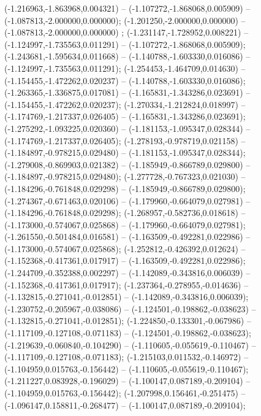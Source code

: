  (-1.216963,-1.863968,0.004321) -- (-1.107272,-1.868068,0.005909) -- (-1.087813,-2.000000,0.000000);
 (-1.201250,-2.000000,0.000000) -- (-1.087813,-2.000000,0.000000) ;
 (-1.231147,-1.728952,0.008221) -- (-1.124997,-1.735563,0.011291) -- (-1.107272,-1.868068,0.005909);
 (-1.243681,-1.595634,0.011668) -- (-1.140788,-1.603330,0.016086) -- (-1.124997,-1.735563,0.011291);
 (-1.254453,-1.464709,0.014630) -- (-1.154455,-1.472262,0.020237) -- (-1.140788,-1.603330,0.016086);
 (-1.263365,-1.336875,0.017081) -- (-1.165831,-1.343286,0.023691) -- (-1.154455,-1.472262,0.020237);
 (-1.270334,-1.212824,0.018997) -- (-1.174769,-1.217337,0.026405) -- (-1.165831,-1.343286,0.023691);
 (-1.275292,-1.093225,0.020360) -- (-1.181153,-1.095347,0.028344) -- (-1.174769,-1.217337,0.026405);
 (-1.278193,-0.978719,0.021158) -- (-1.184897,-0.978215,0.029480) -- (-1.181153,-1.095347,0.028344);
 (-1.279008,-0.869903,0.021382) -- (-1.185949,-0.866789,0.029800) -- (-1.184897,-0.978215,0.029480);
 (-1.277728,-0.767323,0.021030) -- (-1.184296,-0.761848,0.029298) -- (-1.185949,-0.866789,0.029800);
 (-1.274367,-0.671463,0.020106) -- (-1.179960,-0.664079,0.027981) -- (-1.184296,-0.761848,0.029298);
 (-1.268957,-0.582736,0.018618) -- (-1.173000,-0.574067,0.025868) -- (-1.179960,-0.664079,0.027981);
 (-1.261550,-0.501484,0.016581) -- (-1.163509,-0.492281,0.022986) -- (-1.173000,-0.574067,0.025868);
 (-1.252812,-0.426392,0.012624) -- (-1.152368,-0.417361,0.017917) -- (-1.163509,-0.492281,0.022986);
 (-1.244709,-0.352388,0.002297) -- (-1.142089,-0.343816,0.006039) -- (-1.152368,-0.417361,0.017917);
 (-1.237364,-0.278955,-0.014636) -- (-1.132815,-0.271041,-0.012851) -- (-1.142089,-0.343816,0.006039);
 (-1.230752,-0.205967,-0.038086) -- (-1.124501,-0.198862,-0.038623) -- (-1.132815,-0.271041,-0.012851);
 (-1.224850,-0.133301,-0.067986) -- (-1.117109,-0.127108,-0.071183) -- (-1.124501,-0.198862,-0.038623);
 (-1.219639,-0.060840,-0.104290) -- (-1.110605,-0.055619,-0.110467) -- (-1.117109,-0.127108,-0.071183);
 (-1.215103,0.011532,-0.146972) -- (-1.104959,0.015763,-0.156442) -- (-1.110605,-0.055619,-0.110467);
 (-1.211227,0.083928,-0.196029) -- (-1.100147,0.087189,-0.209104) -- (-1.104959,0.015763,-0.156442);
 (-1.207998,0.156461,-0.251475) -- (-1.096147,0.158811,-0.268477) -- (-1.100147,0.087189,-0.209104);
